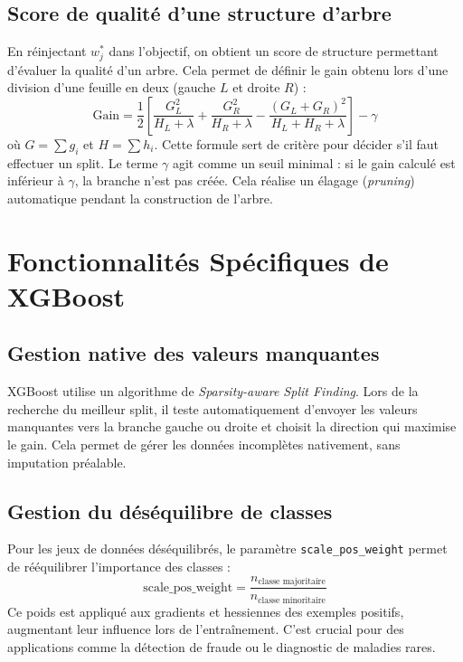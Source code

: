 \subsection{Score de qualité d'une structure d'arbre}
En réinjectant $w_j^*$ dans l'objectif, on obtient un score de structure permettant d'évaluer la qualité d'un arbre. Cela permet de définir le gain obtenu lors d'une division d'une feuille en deux (gauche $L$ et droite $R$) :
\begin{equation}
    \text{Gain} = \frac{1}{2}\left[\frac{G_L^2}{H_L+\lambda} + \frac{G_R^2}{H_R+\lambda} - \frac{(G_L+G_R)^2}{H_L+H_R+\lambda}\right] - \gamma
\end{equation}
où $G = \sum g_i$ et $H = \sum h_i$.
Cette formule sert de critère pour décider s'il faut effectuer un split. Le terme $\gamma$ agit comme un seuil minimal : si le gain calculé est inférieur à $\gamma$, la branche n'est pas créée. Cela réalise un élagage (\textit{pruning}) automatique pendant la construction de l'arbre.

\section{Fonctionnalités Spécifiques de XGBoost}

\subsection{Gestion native des valeurs manquantes}
XGBoost utilise un algorithme de \textit{Sparsity-aware Split Finding}. Lors de la recherche du meilleur split, il teste automatiquement d'envoyer les valeurs manquantes vers la branche gauche ou droite et choisit la direction qui maximise le gain. Cela permet de gérer les données incomplètes nativement, sans imputation préalable.

\subsection{Gestion du déséquilibre de classes}
Pour les jeux de données déséquilibrés, le paramètre \texttt{scale\_pos\_weight} permet de rééquilibrer l'importance des classes :
\begin{equation}
    \text{scale\_pos\_weight} = \frac{n_{\text{classe majoritaire}}}{n_{\text{classe minoritaire}}}
\end{equation}
Ce poids est appliqué aux gradients et hessiennes des exemples positifs, augmentant leur influence lors de l'entraînement. C'est crucial pour des applications comme la détection de fraude ou le diagnostic de maladies rares.

